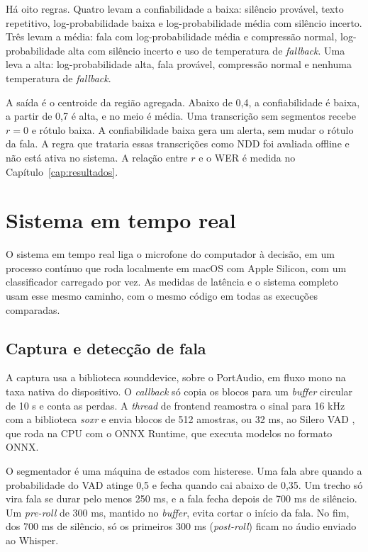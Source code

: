 \documentclass[
    12pt,                %
    openright,           %
    oneside,             %
    a4paper,             %
    english,             %
    brazil               %
]{abntex2}
\begin{document}
Há oito regras. Quatro levam a confiabilidade a baixa: silêncio provável, texto repetitivo, log-probabilidade baixa e log-probabilidade média com silêncio incerto. Três levam a média: fala com log-probabilidade média e compressão normal, log-probabilidade alta com silêncio incerto e uso de temperatura de \textit{fallback}. Uma leva a alta: log-probabilidade alta, fala provável, compressão normal e nenhuma temperatura de \textit{fallback}.

A saída é o centroide da região agregada. Abaixo de 0,4, a confiabilidade é baixa, a partir de 0,7 é alta, e no meio é média. Uma transcrição sem segmentos recebe $r = 0$ e rótulo baixa. A confiabilidade baixa gera um alerta, sem mudar o rótulo da fala. A regra que trataria essas transcrições como NDD foi avaliada offline e não está ativa no sistema. A relação entre $r$ e o WER é medida no Capítulo~\ref{cap:resultados}.


\section{Sistema em tempo real}
\label{sec:sistema_tempo_real}

O sistema em tempo real liga o microfone do computador à decisão, em um processo contínuo que roda localmente em macOS com Apple Silicon, com um classificador carregado por vez. As medidas de latência e o sistema completo usam esse mesmo caminho, com o mesmo código em todas as execuções comparadas.


\subsection{Captura e detecção de fala}
\label{sec:captura}

A captura usa a biblioteca sounddevice, sobre o PortAudio, em fluxo mono na taxa nativa do dispositivo. O \textit{callback} só copia os blocos para um \textit{buffer} circular de 10 s e conta as perdas. A \textit{thread} de frontend reamostra o sinal para 16 kHz com a biblioteca \textit{soxr} e envia blocos de 512 amostras, ou 32 ms, ao Silero VAD \cite{Silero2026}, que roda na CPU com o ONNX Runtime, que executa modelos no formato ONNX.

O segmentador é uma máquina de estados com histerese. Uma fala abre quando a probabilidade do VAD atinge 0,5 e fecha quando cai abaixo de 0,35. Um trecho só vira fala se durar pelo menos 250 ms, e a fala fecha depois de 700 ms de silêncio. Um \textit{pre-roll} de 300 ms, mantido no \textit{buffer}, evita cortar o início da fala. No fim, dos 700 ms de silêncio, só os primeiros 300 ms (\textit{post-roll}) ficam no áudio enviado ao Whisper.
\end{document}
